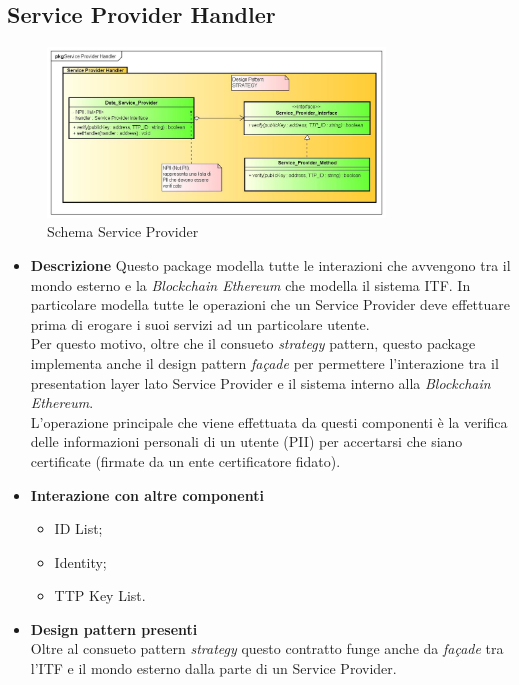 \subsection{Service Provider Handler}
\begin{figure}[!h]
	\centering
	\includegraphics[width=0.8\textwidth]{immagini/serviceproviderhandler}
	\caption{Schema Service Provider}
\end{figure}
\begin{itemize}
	\item \textbf{Descrizione}
	Questo package modella tutte le interazioni che avvengono tra il mondo esterno e la \textit{Blockchain Ethereum} che modella il sistema \gls{ITF}. In particolare modella tutte le operazioni che un Service Provider deve effettuare prima di erogare i suoi servizi ad un particolare utente.\\
	Per questo motivo, oltre che il consueto \textit{strategy} pattern, questo package implementa anche il design pattern \textit{façade} per permettere l'interazione tra il presentation layer lato Service Provider e il sistema interno alla \textit{Blockchain Ethereum}.\\
	L'operazione principale che viene effettuata da questi componenti è la verifica delle informazioni personali di un utente (\gls{PII}) per accertarsi che siano certificate (firmate da un ente certificatore fidato).
	\item \textbf{Interazione con altre componenti}
	\begin{itemize}
		\item ID List;
		\item Identity;
		\item TTP Key List.
	\end{itemize}
	\item \textbf{Design pattern presenti}\\
	Oltre al consueto pattern \textit{strategy} questo contratto funge anche da \textit{façade} tra l'\gls{ITF} e il mondo esterno dalla parte di un Service Provider.
\end{itemize}
